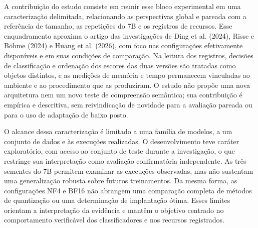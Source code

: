 A contribuição do estudo consiste em reunir esse bloco experimental em uma caracterização delimitada, relacionando as perspectivas global e pareada com a referência de tamanho, as repetições do 7B e os registros de recursos. Esse enquadramento aproxima o artigo das investigações de Ding et al. (2024), Risse e Böhme (2024) e Huang et al. (2026), com foco nas configurações efetivamente disponíveis e em suas condições de comparação. Na leitura dos registros, decisões de classificação e ordenação dos escores das duas versões são tratadas como objetos distintos, e as medições de memória e tempo permanecem vinculadas ao ambiente e ao procedimento que as produziram. O estudo não propõe uma nova arquitetura nem um novo teste de compreensão semântica; sua contribuição é empírica e descritiva, sem reivindicação de novidade para a avaliação pareada ou para o uso de adaptação de baixo posto.

O alcance dessa caracterização é limitado a uma família de modelos, a um conjunto de dados e às execuções realizadas. O desenvolvimento teve caráter exploratório, com acesso ao conjunto de teste durante a investigação, o que restringe sua interpretação como avaliação confirmatória independente. As três sementes do 7B permitem examinar as execuções observadas, mas não sustentam uma generalização robusta sobre futuros treinamentos. Da mesma forma, as configurações NF4 e BF16 não abrangem uma comparação completa de métodos de quantização ou uma determinação de implantação ótima. Esses limites orientam a interpretação da evidência e mantêm o objetivo centrado no comportamento verificável dos classificadores e nos recursos registrados.

\nocite{ding2024primevul,risse2024limits,huang2026trap,hui2024qwen,hu2021lora,dettmers2023qlora}

